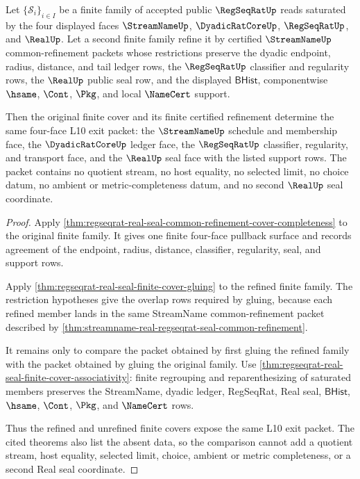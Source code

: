 \begin{theorem}
\label{thm:regseqrat-real-seal-finite-cover-refinement-invariance}
Let $\{\mathcal{S}_i\}_{i\in I}$ be a finite family of accepted public
$\RegSeqRatUp$ reads saturated by the four displayed faces
$\StreamNameUp$, $\DyadicRatCoreUp$, $\RegSeqRatUp$, and $\RealUp$. Let a
second finite family refine it by certified $\StreamNameUp$ common-refinement
packets whose restrictions preserve the dyadic endpoint, radius, distance, and
tail ledger rows, the $\RegSeqRatUp$ classifier and regularity rows, the
$\RealUp$ public seal row, and the displayed $\mathsf{BHist}$, componentwise
$\hsame$, $\Cont$, $\Pkg$, and local $\NameCert$ support.

Then the original finite cover and its finite certified refinement determine
the same four-face L10 exit packet: the $\StreamNameUp$ schedule and membership
face, the $\DyadicRatCoreUp$ ledger face, the $\RegSeqRatUp$ classifier,
regularity, and transport face, and the $\RealUp$ seal face with the listed
support rows. The packet contains no quotient stream, no host equality, no
selected limit, no choice datum, no ambient or metric-completeness datum, and no
second $\RealUp$ seal coordinate.
\end{theorem}
\begin{proof}
Apply
\autoref{thm:regseqrat-real-seal-common-refinement-cover-completeness} to the
original finite family. It gives one finite four-face pullback surface and
records agreement of the endpoint, radius, distance, classifier, regularity,
seal, and support rows.

Apply
\autoref{thm:regseqrat-real-seal-finite-cover-gluing} to the refined finite
family. The restriction hypotheses give the overlap rows required by gluing,
because each refined member lands in the same StreamName common-refinement
packet described by
\autoref{thm:streamname-real-regseqrat-seal-common-refinement}.

It remains only to compare the packet obtained by first gluing the refined
family with the packet obtained by gluing the original family. Use
\autoref{thm:regseqrat-real-seal-finite-cover-associativity}: finite regrouping
and reparenthesizing of saturated members preserves the StreamName, dyadic
ledger, RegSeqRat, Real seal, $\mathsf{BHist}$, $\hsame$, $\Cont$, $\Pkg$, and
$\NameCert$ rows.

Thus the refined and unrefined finite covers expose the same L10 exit packet.
The cited theorems also list the absent data, so the comparison cannot add a
quotient stream, host equality, selected limit, choice, ambient or metric
completeness, or a second Real seal coordinate.
\end{proof}


